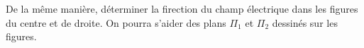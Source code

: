 \documentclass[11pt,fleqn]{book} %
\begin{document}
\begin{capex}
De la même manière, déterminer la firection du champ électrique dans les figures du centre et de droite. On pourra s'aider des plans $\Pi_1$ et $\Pi_2$ dessinés sur les figures.
\end{capex}

%
%
%
\end{document}
